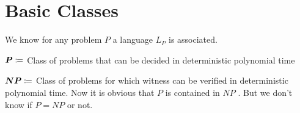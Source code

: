 \documentclass{article}
\begin{document}
\section{Basic Classes}
We know for any problem $P$ a language $L_P$ is associated.
\parinf

$\boldsymbol{P} \coloneqq$ Class of problems that can be decided in deterministic polynomial time

$\boldsymbol{N} \boldsymbol{P} \coloneqq$ Class of problems for which witness can be verified in deterministic polynomial time. Now it is obvious that $P$ is contained in $N P$ . But we don’t know if $P = N P$ or not.




\end{document}
